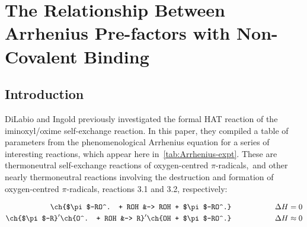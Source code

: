 
\chapter{The Relationship Between Arrhenius Pre-factors with Non-Covalent Binding}
\label{ch:arrhenius}

\section{Introduction}


DiLabio and Ingold\cite{DiLabio2005} previously investigated the formal HAT reaction of the iminoxyl/oxime self-exchange reaction. In this paper, they compiled a table of parameters from the phenomenological Arrhenius equation for a series of interesting reactions, which appear here in~\ref{tab:Arrhenius-expt}.\cite{Kreilick1966, Mader2004, Mahoney1970, DaRooge1967, Howard1973, Foti1994, Chenier1974, Chenier1975} These are thermoneutral self-exchange reactions of oxygen-centred $\pi$-radicals,\footnotemark~and other nearly thermoneutral reactions involving the destruction and formation of oxygen-centred $\pi$-radicals, reactions 3.1 and 3.2, respectively:

\begin{align}
  \ch{$\pi$-RO^. + ROH &-> ROH + $\pi$-RO^.} \hspace{2cm} \Delta H = 0 \\
  \ch{$\pi$-R}^\prime\ch{O^. + ROH &-> R}^\prime\ch{OH + $\pi$-RO^.} \hspace{2cm} \Delta H \approx 0
\end{align}

\newcommand{\tabFig}[2][0.35]{\texttt{[image: figures/\#2.eps]}}

